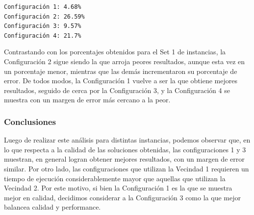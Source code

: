 \begin{verbatim}
Configuración 1: 4.68%
Configuración 2: 26.59%
Configuración 3: 9.57%
Configuración 4: 21.7%
\end{verbatim}

Contrastando con los porcentajes obtenidos para el Set 1 de instancias, la Configuración 2 sigue siendo la que arroja peores resultados, aunque esta vez en un porcentaje menor, mientras que las demás incrementaron su porcentaje de error.  De todos modos, la Configuración 1 vuelve a ser la que obtiene mejores resultados, seguido de cerca por la Configuración 3, y la Configuración 4 se muestra con un margen de error más cercano a la peor.

\subsubsection{Conclusiones} 

Luego de realizar este análisis para distintas instancias, podemos observar que, en lo que respecta a la calidad de las soluciones obtenidas, las configuraciones 1 y 3 muestran, en general logran obtener mejores resultados, con un margen de error similar. Por otro lado, las configuraciones que utilizan la Vecindad 1 requieren un tiempo de ejecución considerablemente mayor que aquellas que utilizan la Vecindad 2.  Por este motivo, si bien la Configuración 1 es la que se muestra mejor en calidad, decidimos considerar a la Configuración 3 como la que mejor balancea calidad y performance.